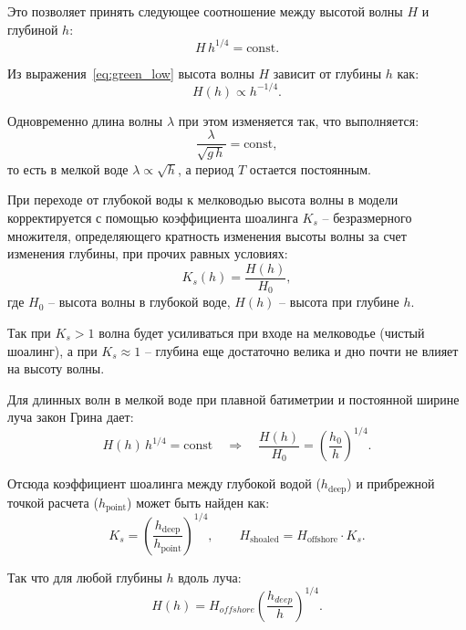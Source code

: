 Это позволяет принять следующее соотношение между высотой волны $H$ и глубиной $h$:
\begin{equation}\label{eq:green_low}
    H\,h^{1/4} = \text{const}.
\end{equation}

Из выражения~\eqref{eq:green_low} высота волны $H$ зависит от глубины $h$ как:
\begin{equation}
    H(h) \propto h^{-1/4}.
\end{equation}

Одновременно длина волны $\lambda$ при этом изменяется так, что выполняется:
\begin{equation}
    \frac{\lambda}{\sqrt{g\,h}} = \text{const},
\end{equation}
то есть в мелкой воде $\lambda \propto \sqrt{h}$, а период $T$ остается постоянным.

При переходе от глубокой воды к мелководью высота волны в модели корректируется с помощью коэффициента шоалинга $K_s$ -- безразмерного множителя, определяющего кратность изменения высоты волны за счет изменения глубины, при прочих равных условиях:
\begin{equation}
    K_s(h) = \frac{H(h)}{H_0},
\end{equation}
где $H_0$ -- высота волны в глубокой воде, 
$H(h)$ -- высота при глубине $h$.

Так при $K_s > 1$ волна будет усиливаться при входе на мелководье (чистый шоалинг), а при $K_s \approx 1$ -- глубина еще достаточно велика и дно почти не влияет на высоту волны.

Для длинных волн в мелкой воде при плавной батиметрии и постоянной ширине луча закон Грина дает:
\begin{equation}
    H(h)\,h^{1/4} = \text{const} \quad\Rightarrow\quad
    \frac{H(h)}{H_0} = \left(\frac{h_0}{h}\right)^{1/4}.
\end{equation}

Отсюда коэффициент шоалинга между глубокой водой ($h_{\text{deep}}$) и прибрежной точкой расчета ($h_{\text{point}}$) может быть найден как:
\begin{equation}
    K_s = \left(\frac{h_{\text{deep}}}{h_{\text{point}}}\right)^{1/4},
    \qquad
    H_{\text{shoaled}} = H_{\text{offshore}} \cdot K_s.
\end{equation}

Так что для любой глубины $h$ вдоль луча:
\begin{equation}\label{eq:green_low_H}
    H(h)=H_{offshore}\left(\frac{h_{deep}}{h}\right)^{1/4}.
\end{equation}

